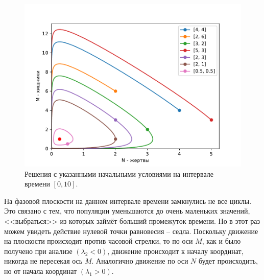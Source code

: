         \begin{figure}[H]
            \centering
            \includegraphics[width=15cm]{pictures/population5.pdf}
            \caption{Решения с указанными начальными условиями на интервале времени $ [0, 10] $.}
        \end{figure}
        На фазовой плоскости на данном интервале времени замкнулись не все циклы. Это связано с тем, что популяции уменьшаются до очень маленьких значений, <<выбраться>> из которых займёт больший промежуток времени. Но в этот раз можем увидеть действие нулевой точки равновесия -- седла. Поскольку движение на плоскости происходит против часовой стрелки, то по оси $ M $, как и было получено при анализе $(\lambda_2 < 0)$, движение происходит к началу координат, никогда не пересекая ось $ M $. Аналогично движение по оси $N$ будет происходить, но от начала координат $(\lambda_1 > 0)$. 


